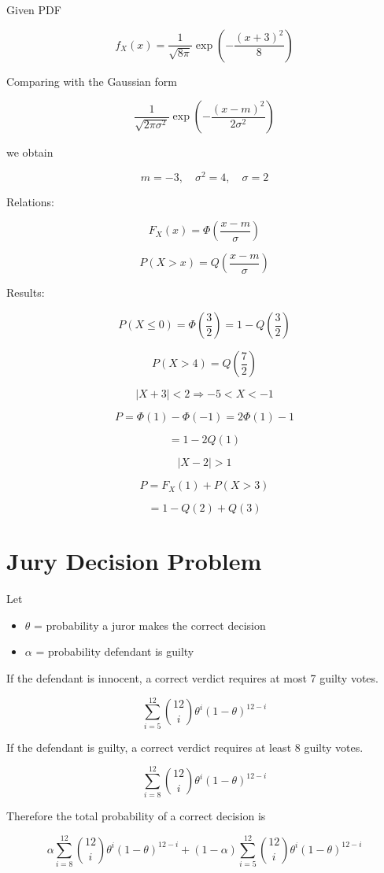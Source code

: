 \documentclass[12pt]{article}
\begin{document}
Given PDF

\[
f_X(x)=\frac{1}{\sqrt{8\pi}}\exp\left(-\frac{(x+3)^2}{8}\right)
\]

Comparing with the Gaussian form

\[
\frac{1}{\sqrt{2\pi\sigma^2}}\exp\left(-\frac{(x-m)^2}{2\sigma^2}\right)
\]

we obtain

\[
m=-3,\quad \sigma^2=4,\quad \sigma=2
\]

Relations:

\[
F_X(x)=\Phi\left(\frac{x-m}{\sigma}\right)
\]

\[
P(X>x)=Q\left(\frac{x-m}{\sigma}\right)
\]

Results:

\[
P(X\le0)=\Phi\left(\frac{3}{2}\right)=1-Q\left(\frac{3}{2}\right)
\]

\[
P(X>4)=Q\left(\frac{7}{2}\right)
\]

\[
|X+3|<2 \Rightarrow -5<X<-1
\]

\[
P=\Phi(1)-\Phi(-1)=2\Phi(1)-1
\]

\[
=1-2Q(1)
\]

\[
|X-2|>1
\]

\[
P=F_X(1)+P(X>3)
\]

\[
=1-Q(2)+Q(3)
\]

\section{Jury Decision Problem}

Let

\begin{itemize}
\item $\theta$ = probability a juror makes the correct decision
\item $\alpha$ = probability defendant is guilty
\end{itemize}

If the defendant is innocent, a correct verdict requires at most 7 guilty votes.

\[
\sum_{i=5}^{12}\binom{12}{i}\theta^i(1-\theta)^{12-i}
\]

If the defendant is guilty, a correct verdict requires at least 8 guilty votes.

\[
\sum_{i=8}^{12}\binom{12}{i}\theta^i(1-\theta)^{12-i}
\]

Therefore the total probability of a correct decision is

\[
\alpha\sum_{i=8}^{12}\binom{12}{i}\theta^i(1-\theta)^{12-i}
+
(1-\alpha)\sum_{i=5}^{12}\binom{12}{i}\theta^i(1-\theta)^{12-i}
\]
\end{document}
